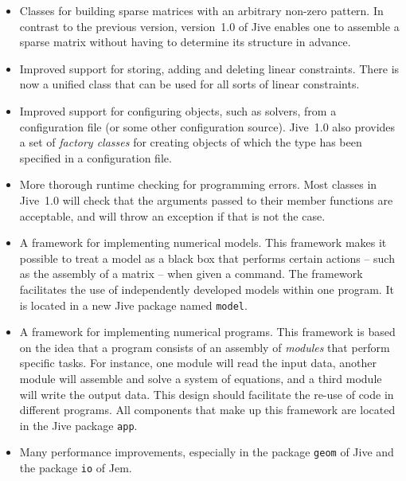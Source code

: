 \documentclass[a4paper,11pt]{article}
\newcommand{\Code}[1]{\texttt{#1}}
\begin{document}
\begin{itemize}
\item Classes for building sparse matrices with an arbitrary non-zero
  pattern. In contrast to the previous version, version~1.0 of Jive
  enables one to assemble a sparse matrix without having to determine
  its structure in advance.

\item Improved support for storing, adding and deleting linear
  constraints. There is now a unified class that can be used for all
  sorts of linear constraints.

\item Improved support for configuring objects, such as solvers, from
  a configuration file (or some other configuration source). Jive~1.0
  also provides a set of \emph{factory classes} for creating objects
  of which the type has been specified in a configuration file.

\item More thorough runtime checking for programming errors. Most
  classes in Jive~1.0 will check that the arguments passed to their
  member functions are acceptable, and will throw an exception if that
  is not the case.

\item A framework for implementing numerical models. This framework
  makes it possible to treat a model as a black box that performs
  certain actions -- such as the assembly of a matrix -- when given a
  command. The framework facilitates the use of independently
  developed models within one program. It is located in a new Jive
  package named \Code{model}.

\item A framework for implementing numerical programs. This framework
  is based on the idea that a program consists of an assembly of
  \emph{modules} that perform specific tasks. For instance, one module
  will read the input data, another module will assemble and solve a
  system of equations, and a third module will write the output data.
  This design should facilitate the re-use of code in different
  programs. All components that make up this framework are located in
  the Jive package \Code{app}.

\item Many performance improvements, especially in the package
  \Code{geom} of Jive and the package \Code{io} of Jem.

\end{itemize}


\end{document}
